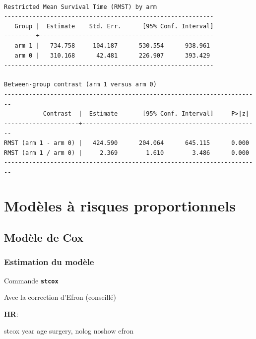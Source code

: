 \documentclass[
  12pt,
  letterpaper,
  DIV=11,
  numbers=noendperiod,
  onepage,
  openany]{scrreprt}
\newenvironment{Shaded}{\begin{snugshade}}{\end{snugshade}}
\newcommand{\FunctionTok}[1]{\textcolor[rgb]{0.94,0.94,0.56}{#1}}
\newcommand{\KeywordTok}[1]{\textcolor[rgb]{0.94,0.87,0.69}{#1}}
\newcommand{\NormalTok}[1]{\textcolor[rgb]{0.80,0.80,0.80}{#1}}
\begin{document}
\begin{verbatim}

Restricted Mean Survival Time (RMST) by arm
-----------------------------------------------------------
   Group |  Estimate    Std. Err.      [95% Conf. Interval]
---------+-------------------------------------------------
   arm 1 |   734.758     104.187      530.554      938.961
   arm 0 |   310.168      42.481      226.907      393.429
-----------------------------------------------------------

Between-group contrast (arm 1 versus arm 0) 
------------------------------------------------------------------------
           Contrast  |  Estimate       [95% Conf. Interval]     P>|z|
---------------------+--------------------------------------------------
RMST (arm 1 - arm 0) |   424.590      204.064      645.115      0.000
RMST (arm 1 / arm 0) |     2.369        1.610        3.486      0.000
------------------------------------------------------------------------
\end{verbatim}

\hypertarget{moduxe8les-uxe0-risques-proportionnels-1}{%
\section{Modèles à risques
proportionnels}\label{moduxe8les-uxe0-risques-proportionnels-1}}

\hypertarget{moduxe8le-de-cox-2}{%
\subsection{Modèle de Cox}\label{moduxe8le-de-cox-2}}

\hypertarget{estimation-du-moduxe8le-1}{%
\subsubsection{Estimation du modèle}\label{estimation-du-moduxe8le-1}}

Commande \textbf{\texttt{stcox}}

Avec la correction d'Efron (conseillé)

\textbf{HR}:

\begin{Shaded}
\begin{Highlighting}[]
\KeywordTok{stcox} \FunctionTok{year}\NormalTok{ age surgery, }\KeywordTok{nolog}\NormalTok{ noshow efron}
\end{Highlighting}
\end{Shaded}
\end{document}
